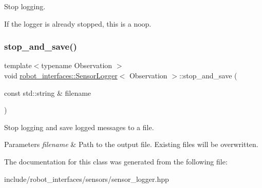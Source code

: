 Stop logging. 

If the logger is already stopped, this is a noop. \mbox{\label{classrobot__interfaces_1_1SensorLogger_a1ab1fc25c3f20624a240430dff78b029}} 
\subsubsection{\texorpdfstring{stop\+\_\+and\+\_\+save()}{stop\_and\_save()}}
{\footnotesize\ttfamily template$<$typename Observation $>$ \\
void \hyperlink{classrobot__interfaces_1_1SensorLogger}{robot\+\_\+interfaces\+::\+Sensor\+Logger}$<$ Observation $>$\+::stop\+\_\+and\+\_\+save (\begin{DoxyParamCaption}\item[{const std\+::string \&}]{filename }\end{DoxyParamCaption})\hspace{0.3cm}{\ttfamily [inline]}}



Stop logging and save logged messages to a file. 


\begin{DoxyParams}{Parameters}
{\em filename} & Path to the output file. Existing files will be overwritten. \\
\hline
\end{DoxyParams}


The documentation for this class was generated from the following file\+:\begin{DoxyCompactItemize}
\item 
include/robot\+\_\+interfaces/sensors/sensor\+\_\+logger.\+hpp\end{DoxyCompactItemize}

